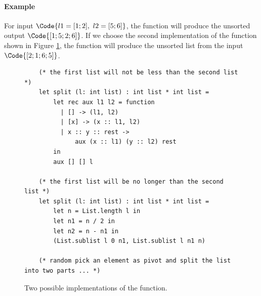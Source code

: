 \paragraph{Example} For input $\Code{l1 = [1;2],\ l2 = [5;6]}$, the  function will produce the unsorted output $\Code{[1;5;2;6]}$. If we choose the second implementation of the  function shown in Figure \ref{fig:split}, the  function will produce the unsorted list from the input $\Code{[2;1;6;5]}$.
\begin{figure}[!t]
    \begin{verbatim}
    (* the first list will not be less than the second list *)
    let split (l: int list) : int list * int list =
        let rec aux l1 l2 = function
          | [] -> (l1, l2)
          | [x] -> (x :: l1, l2)
          | x :: y :: rest ->
              aux (x :: l1) (y :: l2) rest
        in
        aux [] [] l

    (* the first list will be no longer than the second list *)
    let split (l: int list) : int list * int list =
        let n = List.length l in
        let n1 = n / 2 in
        let n2 = n - n1 in
        (List.sublist l 0 n1, List.sublist l n1 n)

    (* random pick an element as pivot and split the list into two parts ... *)
    \end{verbatim}
    \caption{Two possible implementations of the  function.}
    \label{fig:split}
\end{figure}

